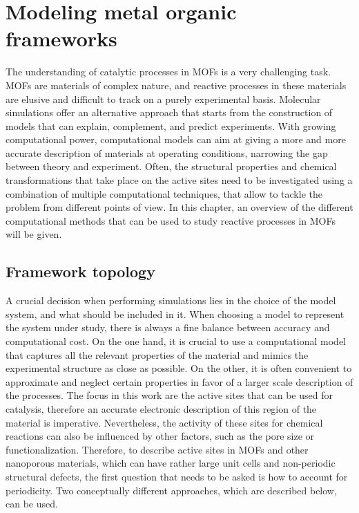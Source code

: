 \graphicspath{{figures/}}
\renewcommand\evenpagerightmark{{\scshape\small Modeling metal organic frameworks}} 
\renewcommand\oddpageleftmark{{\scshape\small Chapter 2}}


\hyphenation{}

\chapter[Modeling metal organic frameworks]%
{Modeling metal organic frameworks}
\label{ch2}
The understanding of catalytic processes in MOFs is a very challenging task. MOFs are materials of complex nature, and reactive processes in these materials are elusive and difficult to track on a purely experimental basis. Molecular simulations offer an alternative approach that starts from the construction of models that can explain, complement, and predict experiments. With growing computational power, computational models can aim at giving a more and more accurate description of materials at operating conditions, narrowing the gap between theory and experiment. Often, the structural properties and chemical transformations that take place on the active sites need to be investigated using a combination of multiple computational techniques, that allow to tackle the problem from different points of view. 
In this chapter, an overview of the different computational methods that can be used to study reactive processes in MOFs will be given. 

\section{Framework topology}
A crucial decision when performing simulations lies in the choice of the model system, and what should be included in it. When choosing a model to represent the system under study, there is always a fine balance between accuracy and computational cost. 
On the one hand, it is crucial to use a computational model that captures all the relevant properties of the material and mimics the experimental structure as close as possible. On the other, it is often convenient to approximate and neglect certain properties in favor of a larger scale description of the processes. The focus in this work are the active sites that can be used for catalysis, therefore an accurate electronic description of this region of the material is imperative. Nevertheless, the activity of these sites for chemical reactions can also be influenced by other factors, such as the pore size or functionalization. Therefore, to describe active sites in MOFs and other nanoporous materials, which can have rather large unit cells and non-periodic structural defects, the first question that needs to be asked is how to account for periodicity. Two conceptually different approaches, which are described below, can be used.

